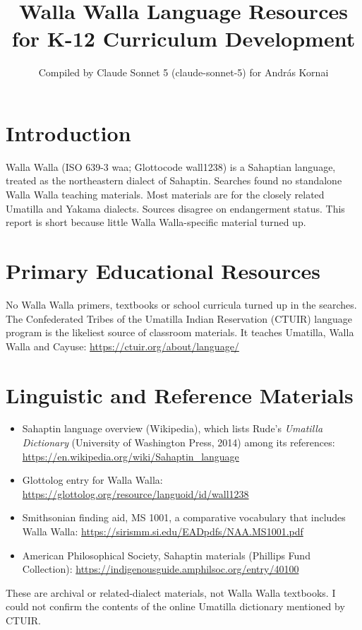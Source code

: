 \documentclass[12pt]{article}
\title{Walla Walla Language Resources for K-12 Curriculum Development}
\author{Compiled by Claude Sonnet 5 (claude-sonnet-5) for Andr\'as Kornai}
\date{}
\begin{document}
\maketitle

\section{Introduction}
Walla Walla (ISO 639-3 waa; Glottocode wall1238) is a Sahaptian language, treated as the northeastern dialect of Sahaptin. Searches found no standalone Walla Walla teaching materials. Most materials are for the closely related Umatilla and Yakama dialects. Sources disagree on endangerment status. This report is short because little Walla Walla-specific material turned up.

\section{Primary Educational Resources}
No Walla Walla primers, textbooks or school curricula turned up in the searches. The Confederated Tribes of the Umatilla Indian Reservation (CTUIR) language program is the likeliest source of classroom materials. It teaches Umatilla, Walla Walla and Cayuse: \url{https://ctuir.org/about/language/}

\section{Linguistic and Reference Materials}
\begin{itemize}
\item Sahaptin language overview (Wikipedia), which lists Rude's \emph{Umatilla Dictionary} (University of Washington Press, 2014) among its references: \url{https://en.wikipedia.org/wiki/Sahaptin_language}
\item Glottolog entry for Walla Walla: \url{https://glottolog.org/resource/languoid/id/wall1238}
\item Smithsonian finding aid, MS 1001, a comparative vocabulary that includes Walla Walla: \url{https://sirismm.si.edu/EADpdfs/NAA.MS1001.pdf}
\item American Philosophical Society, Sahaptin materials (Phillips Fund Collection): \url{https://indigenousguide.amphilsoc.org/entry/40100}
\end{itemize}
These are archival or related-dialect materials, not Walla Walla textbooks. I could not confirm the contents of the online Umatilla dictionary mentioned by CTUIR.
\end{document}
